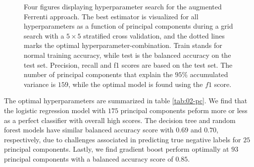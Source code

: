 \begin{figure}[ht!]
  \begin{subfigure}[b]{1.0\textwidth}
    \centering
    
  \end{subfigure}
\par\bigskip
  \begin{subfigure}[b]{0.5\textwidth}
    
    \caption{}
    \label{fig:q2-LOG}
  \end{subfigure}%
  \hfill
  \begin{subfigure}[b]{0.5\textwidth}
    
    \caption{}
    \label{fig:q2-DT}
  \end{subfigure}

  \begin{subfigure}[b]{0.5\textwidth}
    
    \caption{}
    \label{fig:q2-RF}
  \end{subfigure}%
  \hfill
  \begin{subfigure}[b]{0.5\textwidth}
    
    \caption{}
    \label{fig:q2-GB}
  \end{subfigure}
  \vspace*{-130mm}
  \caption{{Four figures displaying hyperparameter search for the augmented Ferrenti approach. The best estimator is visualized for all hyperparameters as a function of principal components during a grid search with a $5\times5$ stratified cross validation, and the dotted lines marks the optimal hyperparameter-combination. Train stands for normal training accuracy, while test is the balanced accuracy on the test set. Precision, recall and f1 scores are based on the test set. The number of principal components that explain the $95\%$ accumulated variance is $159$, while the optimal model is found using the $f1$ score.}}
  \label{fig:02-pca}
\end{figure}

The optimal hyperparameters are summarized in table \ref{tab:02-pc}. We find that the logistic regression model with $175$ principal components peform more or less as a perfect classifier with overall high scores. The decision tree and random forest models have similar balanced accuracy score with $0.69$ and $0.70$, respectively, due to challenges associated in predicting true negative labels for $25$ principal components. Lastly, we find gradient boost perform optimally at $93$ principal components with a balanced accuracy score of $0.85$.

